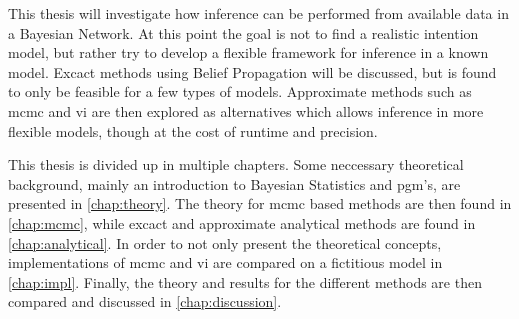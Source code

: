  This thesis will investigate how inference can be performed from available data in a Bayesian Network. At this point the goal is not to find a realistic intention model, but rather try to develop a flexible framework for inference in a known model. Excact methods using Belief Propagation will be discussed, but is found to only be feasible for a few types of models. Approximate methods such as \acrfull{mcmc} and \acrfull{vi} are then explored as alternatives which allows inference in more flexible models, though at the cost of runtime and precision. 

 This thesis is divided up in multiple chapters. Some neccessary theoretical background, mainly an introduction to Bayesian Statistics and \acrfull{pgm}'s, are presented in \cref{chap:theory}. The theory for \acrshort{mcmc} based methods are then found in \cref{chap:mcmc}, while excact and approximate analytical methods are found in \cref{chap:analytical}. In order to not only present the theoretical concepts, implementations of \acrshort{mcmc} and \acrshort{vi} are compared on a fictitious model in \cref{chap:impl}. Finally, the theory and results for the different methods are then compared and discussed in \cref{chap:discussion}.
